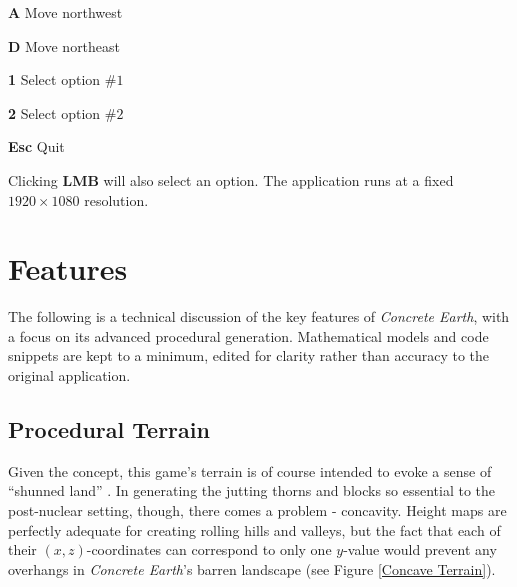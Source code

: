 \documentclass[a4paper, 11pt]{article}
\begin{document}
\begin{flushleft}
\begin{center}
{\vspace{2.5pt}\noindent 
\textbf{A} \dotfill{} Move northwest

\vspace{2.5pt}\noindent 
\textbf{D} \dotfill{} Move northeast

\vspace{2.5pt}\noindent 
\textbf{1} \dotfill{} Select option \#$1$

\vspace{2.5pt}\noindent 
\textbf{2} \dotfill{} Select option \#$2$


\vspace{2.5pt}\noindent 
\textbf{Esc} \dotfill{} Quit
}\linebreak
\end{center}

Clicking \textbf{LMB} will also select an option. The application runs at a fixed $1920 \times 1080$ resolution.

\section{Features}\label{Features}

The following is a technical discussion of the key features of \textit{Concrete Earth}, with a focus on its advanced procedural generation. Mathematical models and code snippets are kept to a minimum, edited for clarity rather than accuracy to the original application.


\subsection{Procedural Terrain}\label{Procedural Terrain} %

Given the concept, this game's terrain is of course intended to evoke a sense of ``shunned land'' \citep{trth93}. In generating the jutting thorns and blocks so essential to the post-nuclear setting, though, there comes a problem - concavity. Height maps are perfectly adequate for creating rolling hills and valleys, but the fact that each of their $(x,z)$-coordinates can correspond to only one $y$-value would prevent any overhangs in \textit{Concrete Earth}'s barren landscape (see Figure \ref{Concave Terrain}).


\end{flushleft}
\end{document}
